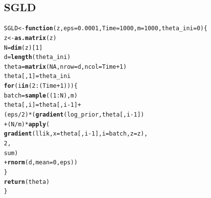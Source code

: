 \documentclass[11pt,a4paper]{report}\usepackage[]{graphicx}\usepackage[]{color}
\makeatletter
\newcommand{\hlnum}[1]{\textcolor[rgb]{0.686,0.059,0.569}{#1}}%
\newcommand{\hlopt}[1]{\textcolor[rgb]{0,0,0}{#1}}%
\newcommand{\hlstd}[1]{\textcolor[rgb]{0.345,0.345,0.345}{#1}}%
\newcommand{\hlkwa}[1]{\textcolor[rgb]{0.161,0.373,0.58}{\textbf{#1}}}%
\newcommand{\hlkwb}[1]{\textcolor[rgb]{0.69,0.353,0.396}{#1}}%
\newcommand{\hlkwc}[1]{\textcolor[rgb]{0.333,0.667,0.333}{#1}}%
\newcommand{\hlkwd}[1]{\textcolor[rgb]{0.737,0.353,0.396}{\textbf{#1}}}%
\newenvironment{kframe}{%
 \def\at@end@of@kframe{}%
 \ifinner\ifhmode%
  \def\at@end@of@kframe{\end{minipage}}%
  \begin{minipage}{\columnwidth}%
 \fi\fi%
 \def\FrameCommand##1{\hskip\@totalleftmargin \hskip-\fboxsep
 \colorbox{shadecolor}{##1}\hskip-\fboxsep
     \hskip-\linewidth \hskip-\@totalleftmargin \hskip\columnwidth}%
 \MakeFramed {\advance\hsize-\width
   \@totalleftmargin\z@ \linewidth\hsize
   \@setminipage}}%
 {\par\unskip\endMakeFramed%
 \at@end@of@kframe}
\newenvironment{knitrout}{}{} %
\makeatother
\begin{document}
\begin{appendix}
\section{SGLD}
\begin{knitrout}
\color{fgcolor}\begin{kframe}
\begin{alltt}
 \hlstd{SGLD}\hlkwb{<-}\hlkwa{function}\hlstd{(}\hlkwc{z}\hlstd{,} \hlkwc{eps}\hlstd{=}\hlnum{0.0001}\hlstd{,} \hlkwc{Time}\hlstd{=}\hlnum{1000}\hlstd{,} \hlkwc{m}\hlstd{=}\hlnum{1000}\hlstd{,} \hlkwc{theta_ini}\hlstd{=}\hlnum{0}\hlstd{) \{}
  \hlstd{z}\hlkwb{<-}\hlkwd{as.matrix}\hlstd{(z)}
  \hlstd{N}\hlkwb{=}\hlkwd{dim}\hlstd{(z)[}\hlnum{1}\hlstd{]}
  \hlstd{d}\hlkwb{=}\hlkwd{length}\hlstd{(theta_ini)}
  \hlstd{theta}\hlkwb{=}\hlkwd{matrix}\hlstd{(}\hlnum{NA}\hlstd{,}\hlkwc{nrow}\hlstd{=d,} \hlkwc{ncol}\hlstd{=Time}\hlopt{+}\hlnum{1}\hlstd{)}
  \hlstd{theta[,}\hlnum{1}\hlstd{]}\hlkwb{=}\hlstd{theta_ini}
  \hlkwa{for}\hlstd{(i} \hlkwa{in} \hlstd{(}\hlnum{2}\hlopt{:}\hlstd{(Time}\hlopt{+}\hlnum{1}\hlstd{))) \{}
    \hlstd{batch}\hlkwb{=}\hlkwd{sample}\hlstd{((}\hlnum{1}\hlopt{:}\hlstd{N),m)}
    \hlstd{theta[,i]}\hlkwb{=}\hlstd{theta[,i}\hlopt{-}\hlnum{1}\hlstd{]} \hlopt{+}
      \hlstd{(eps}\hlopt{/}\hlnum{2}\hlstd{)}\hlopt{*}\hlstd{(}\hlkwd{gradient}\hlstd{(log_prior,theta[,i}\hlopt{-}\hlnum{1}\hlstd{])}
                                     \hlopt{+}\hlstd{(N}\hlopt{/}\hlstd{m)}\hlopt{*}\hlkwd{apply}\hlstd{(}
                                       \hlkwd{gradient}\hlstd{(llik,}\hlkwc{x}\hlstd{=theta[,i}\hlopt{-}\hlnum{1}\hlstd{],}\hlkwc{i}\hlstd{=batch,}\hlkwc{z}\hlstd{=z),}
                                       \hlnum{2}\hlstd{,}
                                       \hlstd{sum)}
                                     \hlopt{+}\hlkwd{rnorm}\hlstd{(d,}\hlkwc{mean}\hlstd{=}\hlnum{0}\hlstd{,eps))}
  \hlstd{\}}
  \hlkwd{return}\hlstd{(theta)}
 \hlstd{\}}


\end{alltt}
\end{kframe}
\end{knitrout}
\end{appendix}
\end{document}

